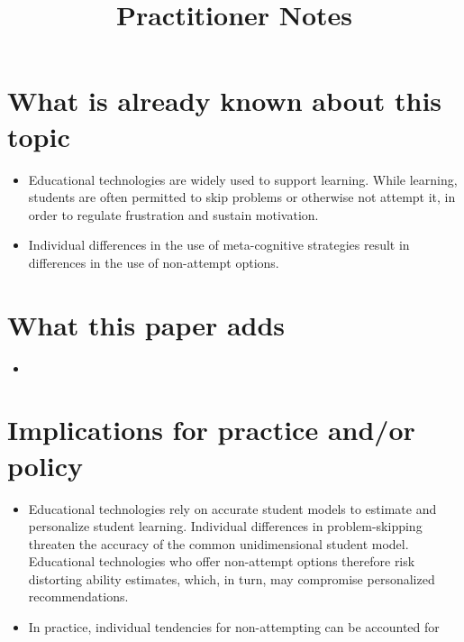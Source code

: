 \documentclass[11pt]{article}
\begin{document}
 

\title{Practitioner Notes}
\author{\noauthor}
\date{\nodate}
\maketitle

\section{What is already known about this topic}
\begin{itemize}
    \item Educational technologies are widely used to support learning. While learning, students are often permitted to skip problems or otherwise not attempt it, in order to regulate frustration and sustain motivation. 
    \item Individual differences in the use of meta-cognitive strategies result in differences in the use of non-attempt options. 
\end{itemize}

\section{What this paper adds}
\begin{itemize}
    \item 
\end{itemize}

\section{Implications for practice and/or policy}
\begin{itemize}
    \item Educational technologies rely on accurate student models to estimate and personalize student learning. Individual differences in problem-skipping threaten the accuracy of the common unidimensional student model. Educational technologies who offer non-attempt options therefore risk distorting ability estimates, which, in turn, may compromise personalized recommendations. 
    \item In practice, individual tendencies for non-attempting can be accounted for 
\end{itemize}
\end{document}
